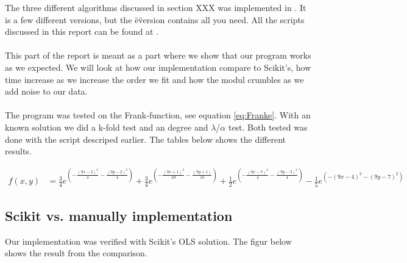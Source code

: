 
The three different algorithms discussed in section XXX was implemented in
\href{https://github.com/erikfsk/fysstk4155-project-1/blob/master/project/project-e.py}{\color{blue}{our script}}.
It is a few different versions, but the \"e\" version contains all you need.
All the scripts discussed in this report can be found at
\href{https://github.com/erikfsk/fysstk4155-project-1/}{\color{blue}{our github}}.
\\
\\
This part of the report is meant as a part where we show that our program works as
we expected. We will look at how our implementation compare to Scikit's, how time increase as we increase
the order we fit and how the modul crumbles as we add noise to our data.
\\
\\
The program was tested on the Frank-function, see equation \ref{eq:Franke}.
With an known solution we did a k-fold test and an degree and $\lambda$/$\alpha$ test.
Both tested was done with the script descriped earlier.
The tables below shows the different results.

\begin{align}
f(x,y) &=
\frac{3}{4} e^{\left(-\frac{(9x-2)^2}{4} - \frac{(9y-2)^2}{4}\right)}
+\frac{3}{4} e^{\left(-\frac{(9x+1)^2}{49}- \frac{(9y+1)}{10}\right)}
+\frac{1}{2} e^{\left(-\frac{(9x-7)^2}{4} - \frac{(9y-3)^2}{4}\right)}
 -\frac{1}{5} e^{\left(-(9x-4)^2 - (9y-7)^2\right)}
\label{eq:Franke}
\end{align}

\subsection{Scikit vs. manually implementation}

Our implementation was verified with Scikit's OLS solution. The figur below shows
the result from the comparison.

